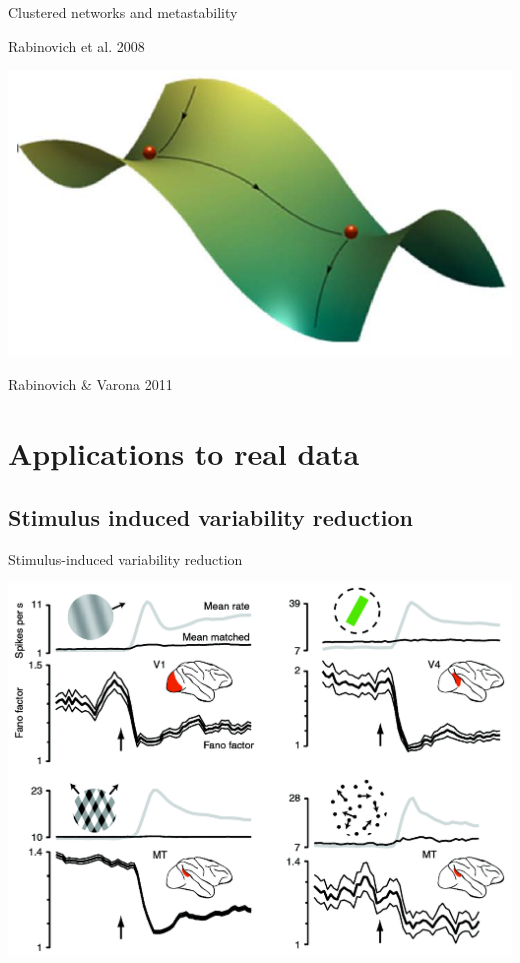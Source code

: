 \documentclass[fleqn]{beamer}
\newcommand{\pc}[1]{\setcounter{page}{#1}}
\newcommand{\ppc}[1]{\pause\setcounter{page}{#1}}
\begin{document}
\begin{frame}{Clustered networks and metastability}
\begin{minipage}{.48\linewidth}
\begin{center}
        \begin{flushright}
        \vspace*{-.3cm}
      {\footnotesize Rabinovich et al. 2008}
    \end{flushright}\ppc{12}
    \includegraphics[width=.9\textwidth]{figures/rabinovich2}
        \begin{flushright}
      {\footnotesize Rabinovich \& Varona 2011}
    \end{flushright}
    \end{center}
 \vspace*{.2cm}
\end{minipage}
\end{frame}


\section{Applications to real data}

\subsection{Stimulus induced variability reduction}

\pc{13}
\begin{frame}{Stimulus-induced variability reduction}
  \begin{center}
     \includegraphics[width=.7\textwidth]{figures/churchland1}
  \end{center}
    \begin{flushright}
	{\footnotesize \cite{Churchland2010}}
    \end{flushright}
\end{frame}
\end{document}
